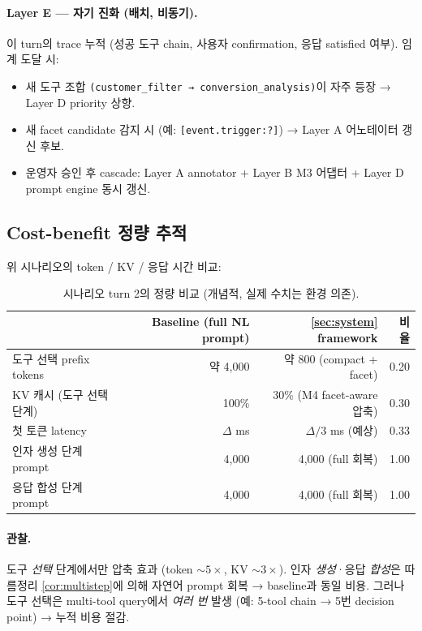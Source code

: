 \documentclass[11pt]{article}
\theoremstyle{definition}
\begin{document}
\paragraph{Layer E — 자기 진화 (배치, 비동기).}
이 turn의 trace 누적 (성공 도구 chain, 사용자 confirmation, 응답 satisfied 여부). 임계 도달 시:
\begin{itemize}[leftmargin=*]
\item 새 도구 조합 \texttt{(customer\_filter → conversion\_analysis)}이 자주 등장 → Layer D priority 상향.
\item 새 facet candidate 감지 시 (예: \texttt{[event.trigger:?]}) → Layer A 어노테이터 갱신 후보.
\item 운영자 승인 후 cascade: Layer A annotator + Layer B M3 어댑터 + Layer D prompt engine 동시 갱신.
\end{itemize}

\subsection{Cost-benefit 정량 추적}

위 시나리오의 token / KV / 응답 시간 비교:

\begin{table}[h]
\centering
\caption{시나리오 turn 2의 정량 비교 (개념적, 실제 수치는 환경 의존).}
\label{tab:scenario-cost}
\small
\begin{tabular}{lrrr}
\toprule
& Baseline (full NL prompt) & \cref{sec:system} framework & 비율 \\
\midrule
도구 선택 prefix tokens & 약 4,000 & 약 800 (compact + facet) & 0.20 \\
KV 캐시 (도구 선택 단계) & 100\% & 30\% (M4 facet-aware 압축) & 0.30 \\
첫 토큰 latency & $\Delta$ ms & $\Delta/3$ ms (예상) & 0.33 \\
인자 생성 단계 prompt & 4,000 & 4,000 (full 회복) & 1.00 \\
응답 합성 단계 prompt & 4,000 & 4,000 (full 회복) & 1.00 \\
\bottomrule
\end{tabular}
\end{table}

\paragraph{관찰.}
도구 \emph{선택} 단계에서만 압축 효과 (token $\sim 5\times$, KV $\sim 3\times$). 인자 \emph{생성}·응답 \emph{합성}은 따름정리 \ref{cor:multistep}에 의해 자연어 prompt 회복 → baseline과 동일 비용. 그러나 도구 선택은 multi-tool query에서 \emph{여러 번} 발생 (예: 5-tool chain → 5번 decision point) → 누적 비용 절감.
\end{document}

